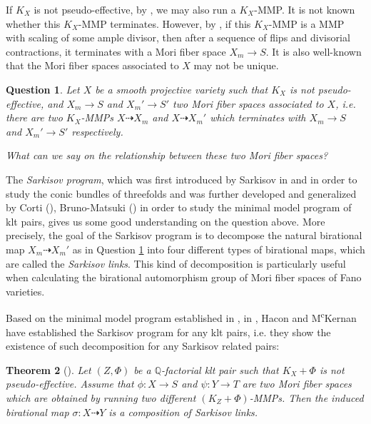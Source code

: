 \documentclass[11pt]{amsart}
\numberwithin{equation}{section}
\newcommand{\Qq}{\mathbb{Q}}
\newtheorem{thm}{Theorem}[section]
\newtheorem{ques}[thm]{Question}
\theoremstyle{definition}
\theoremstyle{remark}
\theoremstyle{definition}
\begin{document}
If $K_X$ is not pseudo-effective, by \cite{BCHM10}, we may also run a $K_X$-MMP. It is not known whether this $K_X$-MMP terminates. However, by \cite[Corollary 1.3.2]{BCHM10}, if this $K_X$-MMP is a MMP with scaling of some ample divisor, then after a sequence of flips and divisorial contractions, it terminates with a Mori fiber space $X_m\rightarrow S$. It is also well-known that the Mori fiber spaces associated to $X$ may not be unique.

\begin{ques}\label{ques: relationship mfs}
Let $X$ be a smooth projective variety such that $K_X$ is not pseudo-effective, and $X_m\rightarrow S$ and $X_m'\rightarrow S'$ two Mori fiber spaces associated to $X$, i.e. there are two $K_X$-MMPs $X\dashrightarrow X_m$ and $X\dashrightarrow X_m'$ which terminates with $X_m\rightarrow S$ and $X_m'\rightarrow S'$ respectively. 

What can we say on the relationship between these two Mori fiber spaces?
\end{ques}

The \emph{Sarkisov program}, which was first introduced by Sarkisov in \cite{Sar80} and \cite{Sar82} in order to study the conic bundles of threefolds and was further developed and generalized by Corti (\cite{Cor95}), Bruno-Matsuki (\cite{BM97}) in order to study the minimal model program of klt pairs, gives us some good understanding on the question above. More precisely, the goal of the Sarkisov program is to decompose the natural birational map $X_m\dashrightarrow X_m'$ as in Question \ref{ques: relationship mfs} into four different types of birational maps, which are called the \emph{Sarkisov links}. This kind of decomposition is particularly useful when calculating the birational automorphism group of Mori fiber spaces of Fano varieties. 

Based on the minimal model program established in \cite{BCHM10}, in \cite{HM09}, Hacon and M\textsuperscript{c}Kernan have established the Sarkisov program for any klt pairs, i.e. they show the existence of such decomposition for any Sarkisov related pairs:

\begin{thm}[{\cite[Theorem 1.3]{HM09}}]\label{thm: existence sarkisov link} 
Let $(Z,\Phi)$ be a $\Qq$-factorial klt pair such that $K_X+\Phi$ is not pseudo-effective. Assume that $\phi: X\rightarrow S$ and $\psi: Y\rightarrow T$ are two Mori fiber spaces which are obtained by running two different $(K_Z+\Phi)$-MMPs. Then the induced birational map $\sigma: X\dashrightarrow Y$ is a composition of Sarkisov links.
\end{thm}
\end{document}
